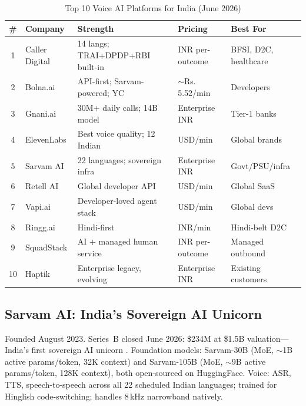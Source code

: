 \documentclass[12pt,a4paper]{article}
\begin{document}
\begin{table}[H]\centering
\caption{Top 10 Voice AI Platforms for India (June 2026)}
\label{tab:india-ecosystem}
\small
\begin{tabularx}{\textwidth}{cL{2.2cm}L{2.8cm}L{1.8cm}X}
\toprule
\# & \textbf{Company} & \textbf{Strength} & \textbf{Pricing} & \textbf{Best For} \\
 & Caller Digital & 14 langs; TRAI+DPDP+RBI built-in & INR per-outcome & BFSI, D2C, healthcare \\
2 & Bolna.ai       & API-first; Sarvam-powered; YC    & $\sim$Rs.\,5.52/min & Developers \\
3 & Gnani.ai       & 30M+ daily calls; 14B model      & Enterprise INR  & Tier-1 banks \\
4 & ElevenLabs     & Best voice quality; 12 Indian    & USD/min         & Global brands \\
5 & Sarvam AI      & 22 languages; sovereign infra    & Enterprise INR  & Govt/PSU/infra \\
6 & Retell AI      & Global developer API             & USD/min         & Global SaaS \\
7 & Vapi.ai        & Developer-loved agent stack      & USD/min         & Global devs \\
8 & Ringg.ai       & Hindi-first                      & INR/min         & Hindi-belt D2C \\
9 & SquadStack     & AI + managed human service       & INR per-outcome & Managed outbound \\
10& Haptik         & Enterprise legacy, evolving      & Enterprise INR  & Existing customers \\
\bottomrule
\end{tabularx}
\end{table}

\subsection{Sarvam AI: India's Sovereign AI Unicorn}

Founded August 2023.  Series~B closed June 2026: \$234M at \$1.5B
valuation---India's first sovereign AI unicorn \cite{slator-sarvam}.
Foundation models: Sarvam-30B (MoE, $\sim$1B active params/token, 32K
context) and Sarvam-105B (MoE, $\sim$9B active params/token, 128K context),
both open-sourced on HuggingFace.  Voice: ASR, TTS, speech-to-speech across
all 22 scheduled Indian languages; trained for Hinglish code-switching;
handles 8\,kHz narrowband natively.
\end{document}
